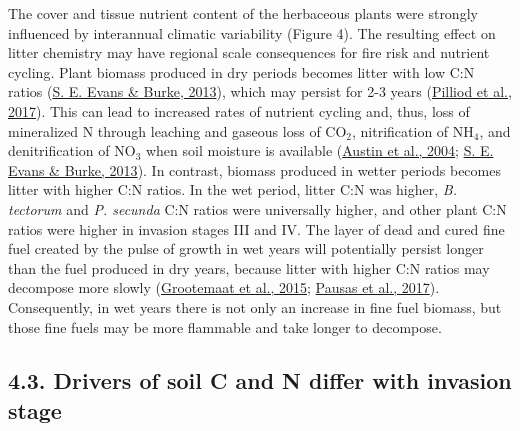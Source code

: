 \documentclass[
  11pt,
  a4paper,
]{article}
\begin{document}
The cover and tissue nutrient content of the herbaceous plants were strongly influenced by interannual climatic variability (Figure 4). The resulting effect on litter chemistry may have regional scale consequences for fire risk and nutrient cycling. Plant biomass produced in dry periods becomes litter with low C:N ratios (\protect\hyperlink{ref-Evans2013}{S. E. Evans \& Burke, 2013}), which may persist for 2-3 years (\protect\hyperlink{ref-Pilliod2017}{Pilliod et al., 2017}). This can lead to increased rates of nutrient cycling and, thus, loss of mineralized N through leaching and gaseous loss of CO\(_2\), nitrification of NH\(_4\), and denitrification of NO\(_3\) when soil moisture is available (\protect\hyperlink{ref-Austin2004}{Austin et al., 2004}; \protect\hyperlink{ref-Evans2013}{S. E. Evans \& Burke, 2013}). In contrast, biomass produced in wetter periods becomes litter with higher C:N ratios. In the wet period, litter C:N was higher, \emph{B. tectorum} and \emph{P. secunda} C:N ratios were universally higher, and other plant C:N ratios were higher in invasion stages III and IV. The layer of dead and cured fine fuel created by the pulse of growth in wet years will potentially persist longer than the fuel produced in dry years, because litter with higher C:N ratios may decompose more slowly (\protect\hyperlink{ref-Grootemaat2015}{Grootemaat et al., 2015}; \protect\hyperlink{ref-Pausas2017}{Pausas et al., 2017}). Consequently, in wet years there is not only an increase in fine fuel biomass, but those fine fuels may be more flammable and take longer to decompose.

\hypertarget{drivers-of-soil-c-and-n-differ-with-invasion-stage}{%
\subsection{4.3. Drivers of soil C and N differ with invasion stage}\label{drivers-of-soil-c-and-n-differ-with-invasion-stage}}
\end{document}
